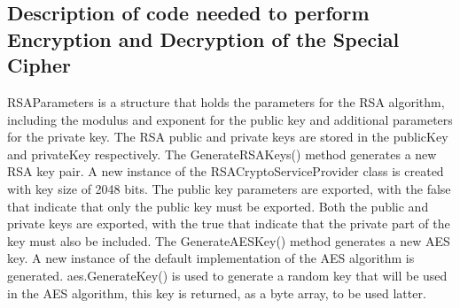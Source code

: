 \documentclass[a4paper,oneside,11pt]{book}
\begin{document}
\subsection{Description of code needed to perform Encryption and Decryption of the Special Cipher}

RSAParameters is a structure that holds the parameters for the RSA algorithm, including the modulus and exponent for the public key and additional parameters for the private key. The RSA public and private keys are stored in the publicKey and privateKey respectively. The GenerateRSAKeys() method generates a new RSA key pair. A new instance of the RSACryptoServiceProvider class is created with key size of 2048 bits. The public key parameters are exported, with the false that indicate that only the public key must be exported. Both the public and private keys are exported, with the true that indicate that the private part of the key must also be included. The GenerateAESKey() method generates a new AES key. A new instance of the default implementation of the AES algorithm is generated. aes.GenerateKey() is used to generate a random key that will be used in the AES algorithm, this key is returned, as a byte array, to be used latter.
\end{document}
